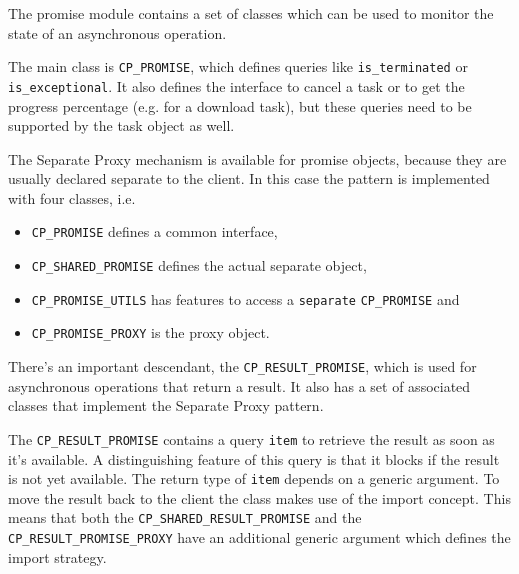 The promise module contains a set of classes which can be used to monitor the state of an asynchronous operation.

The main class is \lstinline!CP_PROMISE!, which defines queries like \lstinline!is_terminated! or \lstinline!is_exceptional!.
It also defines the interface to cancel a task or to get the progress percentage (e.g. for a download task), but these queries need to be supported by the task object as well.

The Separate Proxy mechanism is available for promise objects, because they are usually declared separate to the client.
In this case the pattern is implemented with four classes, i.e.
\begin{itemize}
 \item \lstinline!CP_PROMISE! defines a common interface,
 \item \lstinline!CP_SHARED_PROMISE! defines the actual separate object,
 \item \lstinline!CP_PROMISE_UTILS! has features to access a \lstinline!separate! \lstinline!CP_PROMISE! and
 \item \lstinline!CP_PROMISE_PROXY! is the proxy object.
\end{itemize}

There's an important descendant, the \lstinline!CP_RESULT_PROMISE!, which is used for asynchronous operations that return a result.
It also has a set of associated classes that implement the Separate Proxy pattern.

The \lstinline!CP_RESULT_PROMISE! contains a query \lstinline!item! to retrieve the result as soon as it's available.
A distinguishing feature of this query is that it blocks if the result is not yet available.
The return type of \lstinline!item! depends on a generic argument.
To move the result back to the client the class makes use of the import concept. This means that both the \lstinline!CP_SHARED_RESULT_PROMISE! and the \lstinline!CP_RESULT_PROMISE_PROXY! have an additional generic argument which defines the import strategy.
